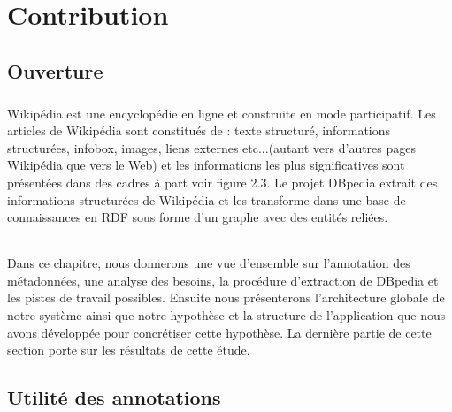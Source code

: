 \chapter{Contribution}
\section{Ouverture}
\paragraph{}
Wikipédia est une encyclopédie en ligne et construite en mode participatif.
Les articles de Wikipédia sont constitués de : texte structuré, informations structurées, infobox, images, liens externes etc...(autant vers d'autres pages Wikipédia que vers le Web) et les informations les plus significatives sont présentées dans des cadres à part voir figure 2.3. 
Le projet DBpedia extrait des informations structurées de Wikipédia et les transforme dans une base de connaissances en RDF sous forme d'un graphe avec des entités reliées.
\subparagraph{}
Dans ce chapitre, nous donnerons une vue d'ensemble sur l'annotation des métadonnées, une analyse des besoins, la procédure d'extraction de DBpedia et les pistes de travail possibles. Ensuite nous présenterons l'architecture globale de notre système ainsi que notre hypothèse et la structure de l'application que nous avons développée pour concrétiser cette hypothèse. La dernière partie de cette section porte sur les résultats de cette étude.
\section{Utilité des annotations}
